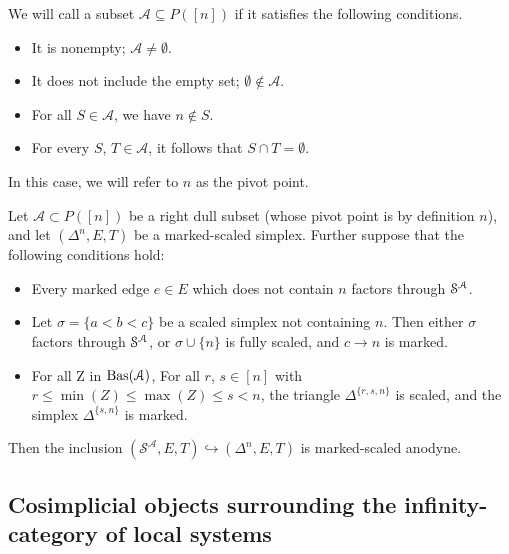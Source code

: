 \documentclass[main.tex]{subfiles}
\begin{document}
\begin{definition}
  We will call a subset $\mathcal{A} \subseteq P([n])$  if it satisfies the following conditions.
  \begin{itemize}
    \item It is nonempty; $\mathcal{A} \neq \emptyset$.

    \item It does not include the empty set; $\emptyset \notin \mathcal{A}$.

    \item For all $S \in \mathcal{A}$, we have $n \notin S$.

    \item For every $S$, $T \in \mathcal{A}$, it follows that $S \cap T = \emptyset$.
  \end{itemize}

  In this case, we will refer to $n$ as the pivot point.
\end{definition}

\begin{lemma}
  \label{lemma:right-anodyne_pivot_trick}
  Let $\mathcal{A} \subset P([n])$ be a right dull subset (whose pivot point is by definition $n$), and let $(\Delta^{n}, E, T)$ be a marked-scaled simplex. Further suppose that the following conditions hold:
  \begin{itemize}
    \item Every marked edge $e \in E$ which does not contain $n$ factors through $\S^{\mathcal{A}}$.

    \item Let $\sigma = \{a < b < c\}$ be a scaled simplex not containing $n$. Then either $\sigma$ factors through $\S^{\mathcal{A}}$, or $\sigma \cup \{n\}$ is fully scaled, and $c \to n$ is marked.

    \item For all Z in  $\Bas(\category{A})$, For all $r$, $s \in [n]$ with $r \leq \min(Z) \leq \max(Z) \leq s < n$, the triangle $\Delta^{\{r, s, n\}}$ is scaled, and the simplex $\Delta^{\{s, n\}}$ is marked.
  \end{itemize}

  Then the inclusion $(\mathcal{S}^{\mathcal{A}}, E, T) \hookrightarrow (\Delta^{n}, E, T)$ is marked-scaled anodyne.
\end{lemma}

\subsection{Cosimplicial objects surrounding the infinity-category of local systems}
\label{ssc:the_infinity_category_of_local_systems}
\end{document}
